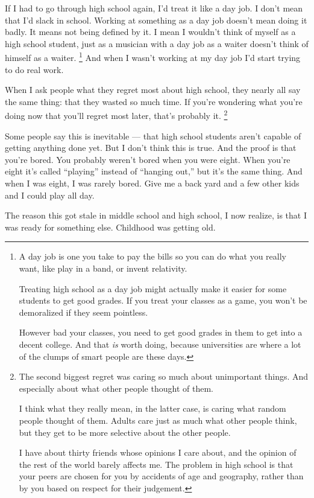 \documentclass[12pt]{book}
\begin{document}
If I had to go through high school again, I'd treat it like a day job. I
don't mean that I'd slack in school. Working at something as a day job
doesn't mean doing it badly. It means not being defined by it. I mean I
wouldn't think of myself as a high school student, just as a musician
with a day job as a waiter doesn't think of himself as a waiter. \footnote{A day job is one you take to pay the bills so you can do what
you really want, like play in a band, or invent relativity.

Treating high school as a day job might actually make it easier for some
students to get good grades. If you treat your classes as a game, you
won't be demoralized if they seem pointless.

However bad your classes, you need to get good grades in them to get
into a decent college. And that \emph{is} worth doing, because
universities are where a lot of the clumps of smart people are these
days.}
And when I wasn't working at my day job I'd start trying to do real
work.

When I ask people what they regret most about high school, they nearly
all say the same thing: that they wasted so much time. If you're
wondering what you're doing now that you'll regret most later, that's
probably it. \footnote{The second biggest regret was caring so much about unimportant
things. And especially about what other people thought of them.

I think what they really mean, in the latter case, is caring what random
people thought of them. Adults care just as much what other people
think, but they get to be more selective about the other people.

I have about thirty friends whose opinions I care about, and the opinion
of the rest of the world barely affects me. The problem in high school
is that your peers are chosen for you by accidents of age and geography,
rather than by you based on respect for their judgement.}

Some people say this is inevitable --- that high school students aren't
capable of getting anything done yet. But I don't think this is true.
And the proof is that you're bored. You probably weren't bored when you
were eight. When you're eight it's called ``playing'' instead of
``hanging out,'' but it's the same thing. And when I was eight, I was
rarely bored. Give me a back yard and a few other kids and I could play
all day.

The reason this got stale in middle school and high school, I now
realize, is that I was ready for something else. Childhood was getting
old.
\end{document}
